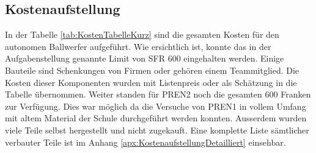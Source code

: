 \subsection{Kostenaufstellung}
In der Tabelle \ref{tab:KostenTabelleKurz} sind die gesamten Kosten für den autonomen 
Ballwerfer aufgeführt. Wie ersichtlich ist, konnte das in der Aufgabenstellung genannte 
Limit von SFR 600 eingehalten werden. Einige Bauteile sind Schenkungen von Firmen 
oder gehören einem Teammitglied. Die Kosten dieser Komponenten wurden mit Listenpreis 
oder als Schätzung in die Tabelle übernommen. Weiter standen für PREN2 noch die gesamten 
600 Franken zur Verfügung. Dies war möglich da die Versuche von PREN1 in vollem Umfang 
mit altem Material der Schule durchgeführt werden konnten. Ausserdem wurden viele Teile selbst 
hergestellt und nicht zugekauft. Eine komplette Liste sämtlicher verbauter Teile ist 
im Anhang \ref{apx:KostenaufstellungDetailliert} einsehbar.

